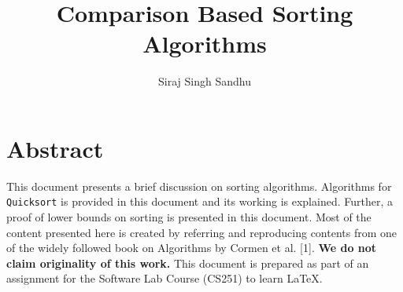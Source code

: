 \documentclass[a4paper, 10pt,twocolumn]{article} %
\title{Comparison Based Sorting Algorithms}
\author{Siraj Singh Sandhu}
\date{}
\begin{document}
\maketitle

\section*{Abstract}
This document presents a brief discussion on sorting algorithms. Algorithms for \texttt{Quicksort} is provided in this document and its working is explained. Further, a proof of lower bounds on sorting is presented in this document. Most of the content presented here is created by referring and reproducing contents from one of the widely followed book on Algorithms by Cormen et al. [1]. \textbf{We do not claim originality of this work.} This document is prepared as part of an assignment for the Software Lab Course (CS251) to learn \LaTeX.
\end{document}
